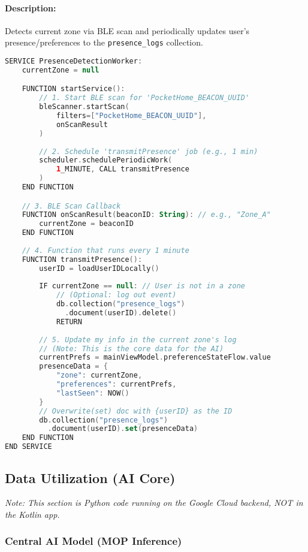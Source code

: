 \documentclass[conference]{IEEEtran}
\begin{document}
\paragraph{Description:} Detects current zone via BLE scan and periodically updates user's presence/preferences to the \texttt{presence\_logs} collection.

\begin{lstlisting}[language=Kotlin]
SERVICE PresenceDetectionWorker:
    currentZone = null

    FUNCTION startService():
        // 1. Start BLE scan for 'PocketHome_BEACON_UUID'
        bleScanner.startScan(
            filters=["PocketHome_BEACON_UUID"], 
            onScanResult
        )
        
        // 2. Schedule 'transmitPresence' job (e.g., 1 min)
        scheduler.schedulePeriodicWork(
            1_MINUTE, CALL transmitPresence
        )
    END FUNCTION

    // 3. BLE Scan Callback
    FUNCTION onScanResult(beaconID: String): // e.g., "Zone_A"
        currentZone = beaconID
    END FUNCTION
    
    // 4. Function that runs every 1 minute
    FUNCTION transmitPresence():
        userID = loadUserIDLocally()
        
        IF currentZone == null: // User is not in a zone
            // (Optional: log out event)
            db.collection("presence_logs")
              .document(userID).delete()
            RETURN
        
        // 5. Update my info in the current zone's log
        // (Note: This is the core data for the AI)
        currentPrefs = mainViewModel.preferenceStateFlow.value
        presenceData = {
            "zone": currentZone,
            "preferences": currentPrefs,
            "lastSeen": NOW()
        }
        // Overwrite(set) doc with {userID} as the ID
        db.collection("presence_logs")
          .document(userID).set(presenceData)
    END FUNCTION
END SERVICE
\end{lstlisting}


\subsection{Data Utilization (AI Core)}
\textit{Note: This section is Python code running on the Google Cloud backend, NOT in the Kotlin app.}

\subsubsection{Central AI Model (MOP Inference)}
\end{document}
